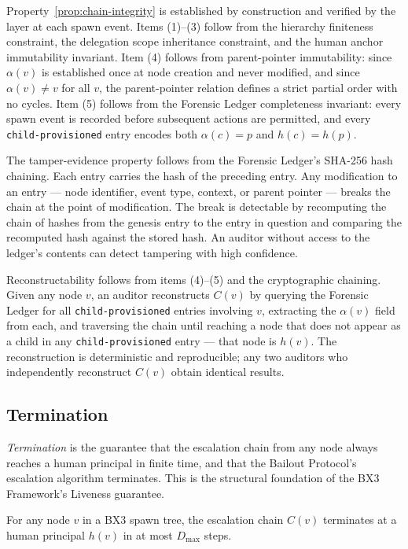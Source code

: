 Property~\ref{prop:chain-integrity} is established by construction and verified by
the \fact{} layer at each spawn event.  Items (1)–(3) follow from the hierarchy
finiteness constraint, the delegation scope inheritance constraint, and the human
anchor immutability invariant.  Item (4) follows from parent-pointer immutability:
since $\alpha(v)$ is established once at node creation and never modified, and
since $\alpha(v) \neq v$ for all $v$, the parent-pointer relation defines a
strict partial order with no cycles.  Item (5) follows from the Forensic Ledger
completeness invariant: every spawn event is recorded before subsequent actions
are permitted, and every \texttt{child-provisioned} entry encodes both
$\alpha(c) = p$ and $h(c) = h(p)$.

The tamper-evidence property follows from the Forensic Ledger's SHA-256 hash
chaining.  Each entry carries the hash of the preceding entry.  Any modification
to an entry — node identifier, event type, context, or parent pointer — breaks
the chain at the point of modification.  The break is detectable by recomputing
the chain of hashes from the genesis entry to the entry in question and comparing
the recomputed hash against the stored hash.  An auditor without access to the
ledger's contents can detect tampering with high confidence.

Reconstructability follows from items (4)–(5) and the cryptographic chaining.
Given any node $v$, an auditor reconstructs $C(v)$ by querying the Forensic
Ledger for all \texttt{child-provisioned} entries involving $v$, extracting the
$\alpha(v)$ field from each, and traversing the chain until reaching a node that
does not appear as a child in any \texttt{child-provisioned} entry — that node
is $h(v)$.  The reconstruction is deterministic and reproducible; any two
auditors who independently reconstruct $C(v)$ obtain identical results.

\subsection{Termination}
\label{sec:rs-termination}

\textit{Termination} is the guarantee that the escalation chain from any node
always reaches a human principal in finite time, and that the Bailout Protocol's
escalation algorithm terminates.  This is the structural foundation of the BX3
Framework's Liveness guarantee.

\begin{property}
\label{prop:finite-termination}
For any node $v$ in a BX3 spawn tree, the escalation chain $C(v)$ terminates
at a human principal $h(v)$ in at most $D_{\max}$ steps.
\end{property}

